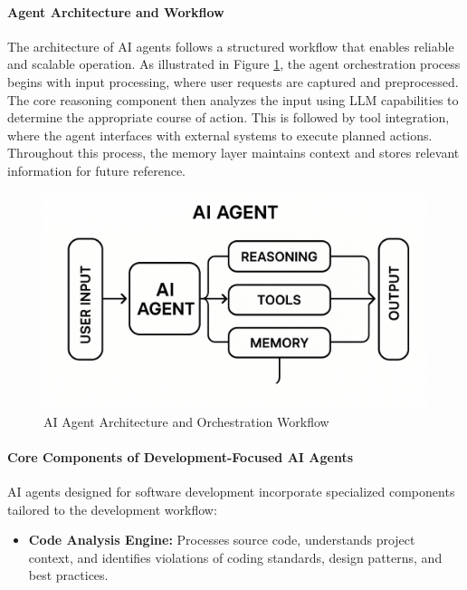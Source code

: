 \begin{spacing}{1.2}
\paragraph{Agent Architecture and Workflow}

The architecture of AI agents follows a structured workflow that enables reliable and scalable operation. As illustrated in Figure \ref{fig:ai_agent_workflow}, the agent orchestration process begins with input processing, where user requests are captured and preprocessed. The core reasoning component then analyzes the input using LLM capabilities to determine the appropriate course of action. This is followed by tool integration, where the agent interfaces with external systems to execute planned actions. Throughout this process, the memory layer maintains context and stores relevant information for future reference.

\begin{figure}[H]
    \centering
    \includegraphics[scale=0.2]{Images/ai_agent.png}
    \caption{AI Agent Architecture and Orchestration Workflow}
    \label{fig:ai_agent_workflow}
\end{figure}

\paragraph{Core Components of Development-Focused AI Agents}

AI agents designed for software development incorporate specialized components tailored to the development workflow:

\begin{itemize}
    \item \textbf{Code Analysis Engine:} Processes source code, understands project context, and identifies violations of coding standards, design patterns, and best practices.
    

\end{itemize}
\end{spacing}
